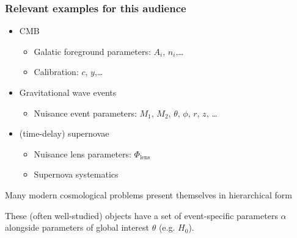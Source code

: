 \documentclass[aspectratio=169]{beamer}
\begin{document}
\begin{frame}
    \frametitle{Relevant examples for this audience}
    \begin{itemize}
        \item CMB
            \begin{itemize}
                \item Galatic foreground parameters: $A_i$, $n_i$,\ldots
                \item Calibration: $c$, $y$,\ldots
            \end{itemize}
        \item Gravitational wave events
            \begin{itemize}
                \item Nuisance event parameters: $M_1$, $M_2$, $\theta$, $\phi$, $r$, $z$, \ldots
            \end{itemize}
        \item (time-delay) supernovae
            \begin{itemize}
                \item Nuisance lens parameters: $\Phi_\text{lens}$
                \item Supernova systematics
            \end{itemize}
    \end{itemize}
    Many modern cosmological problems present themselves in hierarchical form

    These (often well-studied) objects have a set of event-specific parameters $\alpha$ alongside  parameters of global interest $\theta$ (e.g. $H_0$).
\end{frame}
\end{document}
